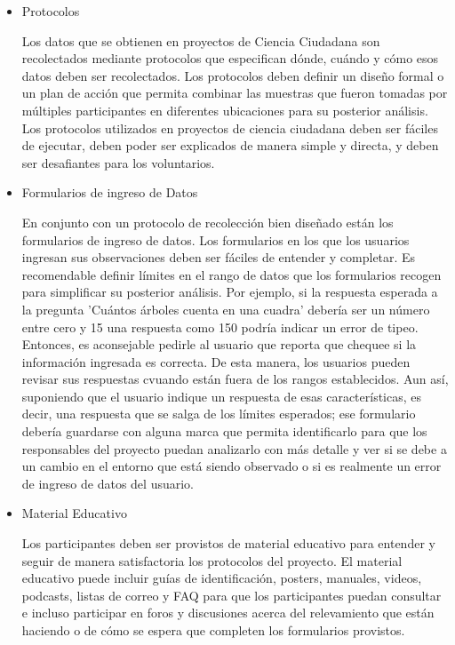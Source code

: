 \begin{itemize}
	\item {Protocolos}	
			
			Los datos que se obtienen en proyectos de Ciencia Ciudadana son recolectados mediante protocolos que especifican dónde, cuándo y cómo esos datos deben ser recolectados. Los protocolos deben definir un diseño formal o un plan de acción que permita combinar las muestras que fueron tomadas por múltiples participantes en diferentes ubicaciones para su posterior análisis. Los protocolos utilizados en proyectos de ciencia ciudadana deben ser fáciles de ejecutar, deben poder ser explicados de manera simple y directa, y deben ser desafiantes para los voluntarios.		
		
	\item {Formularios de ingreso de Datos}	
			
			En conjunto con un protocolo de recolección bien diseñado están los formularios de ingreso de datos. Los formularios en los que los usuarios ingresan sus observaciones deben ser fáciles de entender y completar. 
			Es recomendable definir límites en el rango de datos que los formularios recogen para simplificar su posterior análisis. Por ejemplo, si la respuesta esperada a la pregunta 'Cuántos árboles cuenta en una cuadra' debería ser un número entre cero y 15 una respuesta como 150 podría indicar un error de tipeo. Entonces, es aconsejable pedirle al usuario que reporta que chequee si la información ingresada es correcta. De esta manera, los usuarios pueden revisar sus respuestas cvuando están fuera de los rangos establecidos. Aun así, suponiendo que el usuario indique un respuesta de esas características, es decir, una respuesta que se salga de los límites esperados; ese formulario debería guardarse con alguna marca que permita identificarlo para que los responsables del proyecto puedan analizarlo con más detalle y ver si se debe a un cambio en el entorno que está siendo observado o si es realmente un error de ingreso de datos del usuario.
			
	\item {Material Educativo}
		
		Los participantes deben ser provistos de material educativo para entender y seguir de manera satisfactoria los protocolos del proyecto. El material educativo puede incluir guías de identificación, posters, manuales, videos, podcasts, listas de correo y FAQ para que los participantes puedan consultar e incluso participar en foros y discusiones acerca del relevamiento que están haciendo o de cómo se espera que completen los formularios provistos. \cite{bonney2009citizen}
		
		
\end{itemize} 

